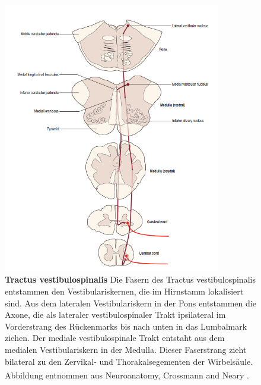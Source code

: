 \documentclass[12pt,a4paper,pdftex]{article}
\begin{document}
\begin{figure}[H]
    \centering
    \includegraphics[width=0.85\textwidth]{pictures/Bilder_Laura/vestibulospinal_tract.PNG}
    \caption[Tractus vestibulospinalis]{\textbf{Tractus vestibulospinalis} Die Fasern des Tractus vestibulospinalis entstammen den Vestibulariskernen, die im Hirnstamm lokalisiert sind. Aus dem lateralen Vestibulariskern in der Pons entstammen die Axone, die als lateraler vestibulospinaler Trakt ipsilateral im Vorderstrang des Rückenmarks bis nach unten in das Lumbalmark ziehen. Der mediale vestibulospinale Trakt entstaht aus dem medialen Vestibulariskern in der Medulla. Dieser Faserstrang zieht bilateral zu den Zervikal- und Thorakalsegementen der Wirbelsäule. Abbildung entnommen aus Neuroanatomy, Crossmann and Neary \textsuperscript{\cite[8]{crossman2014neuroanatomy}}.}
    \label{fig:tr_vestibulospinalis}
\end{figure}
\end{document}
